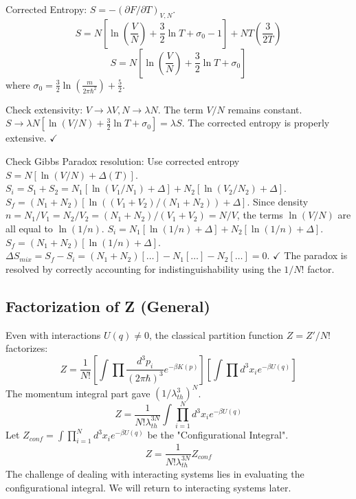 \documentclass[11pt]{article}
\begin{document}
Corrected Entropy: $S = -(\partial F / \partial T)_{V,N}$.
\[ S = N \left[ \ln\left(\frac{V}{N}\right) + \frac{3}{2}\ln T + \sigma_0 - 1 \right] + NT \left( \frac{3}{2T} \right) \]
\[ S = N \left[ \ln\left(\frac{V}{N}\right) + \frac{3}{2}\ln T + \sigma_0 \right] \]
where $\sigma_0 = \frac{3}{2} \ln(\frac{m}{2\pi\hbar^2}) + \frac{5}{2}$.

Check extensivity: $V \to \lambda V, N \to \lambda N$. The term $V/N$ remains constant.
$S \to \lambda N [\ln(V/N) + \frac{3}{2}\ln T + \sigma_0] = \lambda S$. The corrected entropy is properly extensive. $\checkmark$

Check Gibbs Paradox resolution: Use corrected entropy $S = N[\ln(V/N) + \Delta(T)]$.
$S_i = S_1 + S_2 = N_1[\ln(V_1/N_1) + \Delta] + N_2[\ln(V_2/N_2) + \Delta]$.
$S_f = (N_1+N_2)[\ln((V_1+V_2)/(N_1+N_2)) + \Delta]$.
Since density $n = N_1/V_1 = N_2/V_2 = (N_1+N_2)/(V_1+V_2) = N/V$, the terms $\ln(V/N)$ are all equal to $\ln(1/n)$.
$S_i = N_1[\ln(1/n)+\Delta] + N_2[\ln(1/n)+\Delta]$.
$S_f = (N_1+N_2)[\ln(1/n)+\Delta]$.
$\Delta S_{mix} = S_f - S_i = (N_1+N_2)[\dots] - N_1[\dots] - N_2[\dots] = 0$. $\checkmark$
The paradox is resolved by correctly accounting for indistinguishability using the $1/N!$ factor.

\subsection*{Factorization of Z (General)}
Even with interactions $U(q) \neq 0$, the classical partition function $Z=Z'/N!$ factorizes:
\[ Z = \frac{1}{N!} \left[ \int \prod \frac{d^3 p_i}{(2\pi\hbar)^3} e^{-\beta K(p)} \right] \left[ \int \prod d^3 x_i e^{-\beta U(q)} \right] \]
The momentum integral part gave $(1/\lambda_{th}^3)^N$.
\[ Z = \frac{1}{N! \lambda_{th}^{3N}} \int \prod_{i=1}^N d^3 x_i e^{-\beta U(q)} \]
Let $Z_{conf} = \int \prod_{i=1}^N d^3 x_i e^{-\beta U(q)}$ be the "Configurational Integral".
\[ Z = \frac{1}{N! \lambda_{th}^{3N}} Z_{conf} \]
The challenge of dealing with interacting systems lies in evaluating the configurational integral. We will return to interacting systems later.
\end{document}
